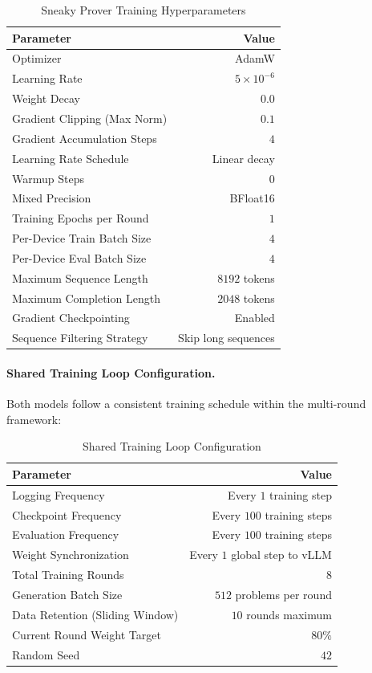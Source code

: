 \begin{table}[h]
\centering
\caption{Sneaky Prover Training Hyperparameters}
\label{tab:prover_hyperparams}
\begin{tabular}{lr}
\toprule
\textbf{Parameter} & \textbf{Value} \\
\midrule
Optimizer & AdamW \\
Learning Rate & $5 \times 10^{-6}$ \\
Weight Decay & $0.0$ \\
Gradient Clipping (Max Norm) & $0.1$ \\
Gradient Accumulation Steps & $4$ \\
Learning Rate Schedule & Linear decay \\
Warmup Steps & $0$ \\
Mixed Precision & BFloat16 \\
Training Epochs per Round & $1$ \\
Per-Device Train Batch Size & $4$ \\
Per-Device Eval Batch Size & $4$ \\
Maximum Sequence Length & $8192$ tokens \\
Maximum Completion Length & $2048$ tokens \\
Gradient Checkpointing & Enabled \\
Sequence Filtering Strategy & Skip long sequences \\
\bottomrule
\end{tabular}
\end{table}

\paragraph{Shared Training Loop Configuration.} Both models follow a consistent training schedule within the multi-round framework:

\begin{table}[h]
\centering
\caption{Shared Training Loop Configuration}
\label{tab:training_loop}
\begin{tabular}{lr}
\toprule
\textbf{Parameter} & \textbf{Value} \\
\midrule
Logging Frequency & Every $1$ training step \\
Checkpoint Frequency & Every $100$ training steps \\
Evaluation Frequency & Every $100$ training steps \\
Weight Synchronization & Every $1$ global step to vLLM \\
Total Training Rounds & $8$ \\
Generation Batch Size & $512$ problems per round \\
Data Retention (Sliding Window) & $10$ rounds maximum \\
Current Round Weight Target & $80\%$ \\
Random Seed & $42$ \\
\bottomrule
\end{tabular}
\end{table}

